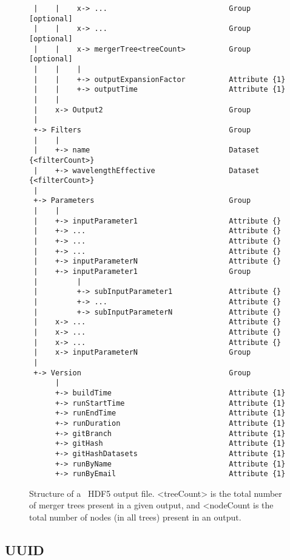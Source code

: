 \begin{figure}
\begin{center}
\begin{verbatim}
 |    |    x-> ...                            Group              [optional]
 |    |    x-> ...                            Group              [optional]
 |    |    x-> mergerTree<treeCount>          Group              [optional]
 |    |    |
 |    |    +-> outputExpansionFactor          Attribute {1}
 |    |    +-> outputTime                     Attribute {1}
 |    |
 |    x-> Output2                             Group
 |
 +-> Filters                                  Group
 |    |
 |    +-> name                                Dataset   {<filterCount>}
 |    +-> wavelengthEffective                 Dataset   {<filterCount>}
 |
 +-> Parameters                               Group
 |    |
 |    +-> inputParameter1                     Attribute {}
 |    +-> ...                                 Attribute {}
 |    +-> ...                                 Attribute {}
 |    +-> ...                                 Attribute {}
 |    +-> inputParameterN                     Attribute {}
 |    +-> inputParameter1                     Group
 |         |
 |         +-> subInputParameter1             Attribute {}
 |         +-> ...                            Attribute {}
 |         +-> subInputParameterN             Attribute {}
 |    x-> ...                                 Attribute {}
 |    x-> ...                                 Attribute {}
 |    x-> ...                                 Attribute {}
 |    x-> inputParameterN                     Group
 |
 +-> Version                                  Group
      |
      +-> buildTime                           Attribute {1}
      +-> runStartTime                        Attribute {1}
      +-> runEndTime                          Attribute {1}
      +-> runDuration                         Attribute {1}
      +-> gitBranch                           Attribute {1}
      +-> gitHash                             Attribute {1}
      +-> gitHashDatasets                     Attribute {1}
      +-> runByName                           Attribute {1}
      +-> runByEmail                          Attribute {1}
\end{verbatim}
\end{center}
\caption{Structure of a \glc\ HDF5 output file. {\normalfont \ttfamily <treeCount>} is the total number of merger trees present in a given output, and {\normalfont \ttfamily <nodeCount} is the total number of nodes (in all trees) present in an output.}
\label{fig:glcOutputFileStructure}
\end{figure}

\subsection{UUID}\label{sec:UUID}

